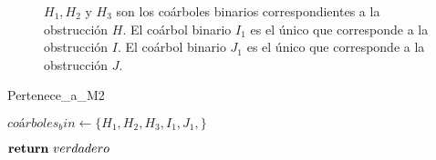 \begin{figure}[h!]
\begin{subfigure}{0.6\textwidth}
\end{subfigure}
\setlength{\abovecaptionskip}{5pt}
\caption{$H_1, H_2$ y $H_3$ son los coárboles binarios correspondientes a la obstrucción $H$. El coárbol binario $I_1$ es el único que corresponde a la obstrucción $I$. El coárbol binario $J_1$ es el único que corresponde a la obstrucción $J$.}\label{fig_obsts_bin}


\end{figure}


\begin{algorithm}[!htbp]
\caption{Pertenece\_a\_M2}
\label{alg_decision}
\DontPrintSemicolon %

 $coárboles_bin \gets \{H_1, H_2, H_3, I_1, J_1, \}$\;
 

$\Return\ verdadero$\;

\end{algorithm}
    